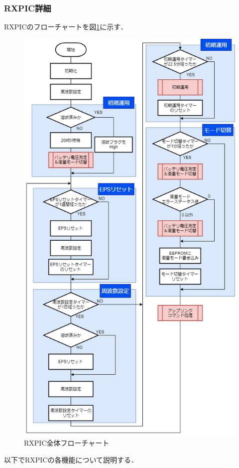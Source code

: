 \subsubsection{RXPIC詳細}\label{subsubsec:RXPIC詳細}
RXPICのフローチャートを図\ref{fig:3-4-2-1}に示す．
\begin{figure}[H]
	\centering
	\includegraphics[scale=0.5]{03/fig/3-4-2-1.png}
	\caption{RXPIC全体フローチャート}
	\label{fig:3-4-2-1}
\end{figure}
以下でRXPICの各機能について説明する．
